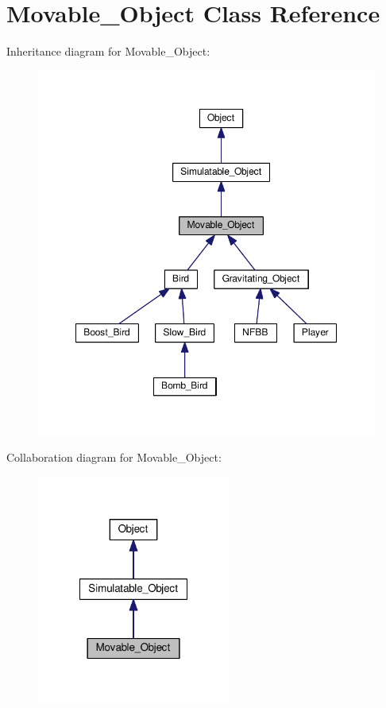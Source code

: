 \hypertarget{classMovable__Object}{\section{Movable\+\_\+\+Object Class Reference}
\label{classMovable__Object}
}


Inheritance diagram for Movable\+\_\+\+Object\+:\nopagebreak
\begin{figure}[H]
\begin{center}
\leavevmode
\includegraphics[width=350pt]{classMovable__Object__inherit__graph}
\end{center}
\end{figure}


Collaboration diagram for Movable\+\_\+\+Object\+:\nopagebreak
\begin{figure}[H]
\begin{center}
\leavevmode
\includegraphics[width=180pt]{classMovable__Object__coll__graph}
\end{center}
\end{figure}
